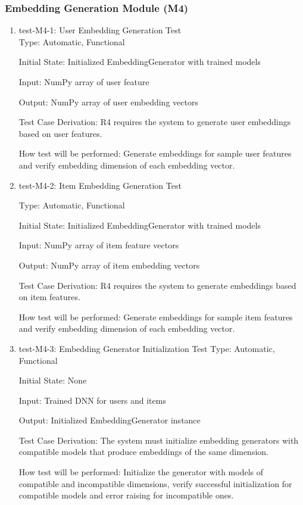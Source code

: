 \documentclass[12pt, titlepage]{article}
\begin{document}
\subsubsection{Embedding Generation Module (M4)}
\begin{enumerate}

  \item{test-M4-1: User Embedding Generation Test\\}
  Type: Automatic, Functional
            
  Initial State: Initialized EmbeddingGenerator with trained models
            
  Input: NumPy array of user feature
            
  Output: NumPy array of user embedding vectors
  
  Test Case Derivation: R4 requires the system to generate user embeddings based on user features.
  
  How test will be performed: Generate embeddings for sample user features and verify embedding dimension of each embedding vector.

  \item{test-M4-2: Item Embedding Generation Test\\}
  
  Type: Automatic, Functional

  Initial State: Initialized EmbeddingGenerator with trained models

  Input: NumPy array of item feature vectors

  Output: NumPy array of item embedding vectors

  Test Case Derivation: R4 requires the system to generate embeddings based on item features.

  How test will be performed: Generate embeddings for sample item features and verify embedding dimension of each embedding vector.

  \item{test-M4-3: Embedding Generator Initialization Test}
  Type: Automatic, Functional

  Initial State: None

  Input: Trained DNN for users and items

  Output: Initialized EmbeddingGenerator instance

  Test Case Derivation: The system must initialize embedding generators with compatible models that produce embeddings of the same dimension.

  How test will be performed: Initialize the generator with models of compatible and incompatible dimensions, verify successful initialization for compatible models and error raising for incompatible ones.
  \end{enumerate}
\end{document}
